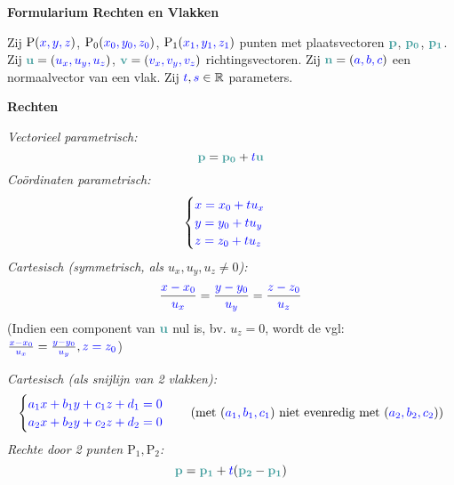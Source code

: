 \documentclass[12pt]{article}
\renewcommand{\vec}[1]{\textcolor{vectorTeal}{\mathbf{#1}}}
\newcommand{\scalar}[1]{\textcolor{scalarBrightBlue}{#1}}
\newcommand{\punt}[1]{\mathrm{#1}}
\begin{document}
\begin{center}
\Large \textbf{Formularium Rechten en Vlakken}
\end{center}

\vspace{1em} %

Zij $\punt{P}(\scalar{x, y, z})$, $\punt{P_0}(\scalar{x_0, y_0, z_0})$, $\punt{P_1}(\scalar{x_1, y_1, z_1})$ punten met plaatsvectoren $\vec{p}$, $\vec{p_0}$, $\vec{p_1}$.
Zij $\vec{u}=(\scalar{u_x, u_y, u_z})$, $\vec{v}=(\scalar{v_x, v_y, v_z})$ richtingsvectoren.
Zij $\vec{n}=(\scalar{a, b, c})$ een normaalvector van een vlak.
Zij $\scalar{t}, \scalar{s} \in \mathbb{R}$ parameters.

\vspace{1.5em} %
{\centering
\textcolor{headerBrown}{\large\textbf{Rechten}}
\par
}%
\textit{Vectorieel parametrisch:}
\[
\vec{p} = \vec{p_0} + \scalar{t} \vec{u}
\]
\textit{Coördinaten parametrisch:}
\[
\begin{cases}
\scalar{x = x_0 + t u_x} \\
\scalar{y = y_0 + t u_y} \\
\scalar{z = z_0 + t u_z}
\end{cases}
\]
\textit{Cartesisch (symmetrisch, als $u_x, u_y, u_z \neq 0$):}
\[
\frac{\scalar{x - x_0}}{\scalar{u_x}} = \frac{\scalar{y - y_0}}{\scalar{u_y}} = \frac{\scalar{z - z_0}}{\scalar{u_z}}
\]
(Indien een component van $\vec{u}$ nul is, bv. $u_z=0$, wordt de vgl: $\frac{\scalar{x - x_0}}{\scalar{u_x}} = \frac{\scalar{y - y_0}}{\scalar{u_y}}, \scalar{z = z_0}$)

\textit{Cartesisch (als snijlijn van 2 vlakken):}
\[
\begin{cases}
\scalar{a_1 x + b_1 y + c_1 z + d_1 = 0} \\
\scalar{a_2 x + b_2 y + c_2 z + d_2 = 0}
\end{cases}
\quad (\text{met } (\scalar{a_1, b_1, c_1}) \text{ niet evenredig met } (\scalar{a_2, b_2, c_2}))
\]
\textit{Rechte door 2 punten $\punt{P_1}, \punt{P_2}$:}
\[
\vec{p} = \vec{p_1} + \scalar{t} (\vec{p_2} - \vec{p_1})
\]
\end{document}
